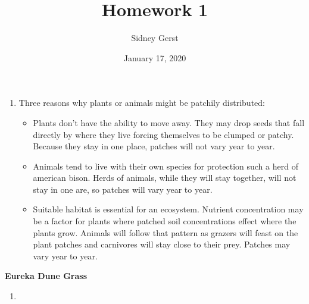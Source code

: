 \documentclass[]{article}
\title{Homework 1}
\author{Sidney Gerst}
\date{January 17, 2020}
\newenvironment{Shaded}{\begin{snugshade}}{\end{snugshade}}
\newcommand{\KeywordTok}[1]{\textcolor[rgb]{0.13,0.29,0.53}{\textbf{#1}}}
\newcommand{\DataTypeTok}[1]{\textcolor[rgb]{0.13,0.29,0.53}{#1}}
\newcommand{\DecValTok}[1]{\textcolor[rgb]{0.00,0.00,0.81}{#1}}
\newcommand{\StringTok}[1]{\textcolor[rgb]{0.31,0.60,0.02}{#1}}
\newcommand{\CommentTok}[1]{\textcolor[rgb]{0.56,0.35,0.01}{\textit{#1}}}
\newcommand{\OtherTok}[1]{\textcolor[rgb]{0.56,0.35,0.01}{#1}}
\newcommand{\OperatorTok}[1]{\textcolor[rgb]{0.81,0.36,0.00}{\textbf{#1}}}
\newcommand{\NormalTok}[1]{#1}
\providecommand{\tightlist}{%
  \setlength{\itemsep}{0pt}\setlength{\parskip}{0pt}}
\begin{document}
\maketitle

\begin{enumerate}
\def\labelenumi{\arabic{enumi}.}
\tightlist
\item
  Three reasons why plants or animals might be patchily distributed:

  \begin{itemize}
  \tightlist
  \item
    Plants don't have the ability to move away. They may drop seeds that
    fall directly by where they live forcing themselves to be clumped or
    patchy. Because they stay in one place, patches will not vary year
    to year.\\
  \item
    Animals tend to live with their own species for protection such a
    herd of american bison. Herds of animals, while they will stay
    together, will not stay in one are, so patches will vary year to
    year.
  \item
    Suitable habitat is essential for an ecosystem. Nutrient
    concentration may be a factor for plants where patched soil
    concentrations effect where the plants grow. Animals will follow
    that pattern as grazers will feast on the plant patches and
    carnivores will stay close to their prey. Patches may vary year to
    year.
  \end{itemize}
\end{enumerate}

\textbf{Eureka Dune Grass}

\begin{enumerate}
\def\labelenumi{\arabic{enumi}.}
\setcounter{enumi}{1}
\item
\end{enumerate}

\begin{Shaded}
\end{Shaded}
\end{document}
